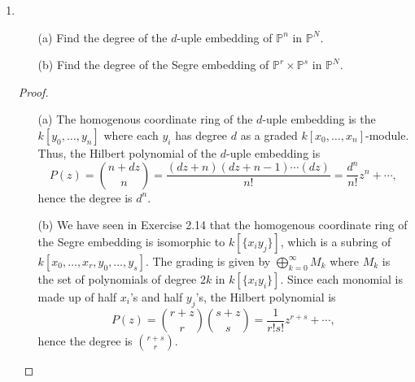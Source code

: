 \documentclass[12pt]{article}
\newcommand{\PP}{\mathbb{P}}
\theoremstyle{definition}
\begin{document}
\begin{enumerate} [label=\textbf{\arabic*.}, leftmargin=-0.05em]

\item \begin{itemize}
  \item[(a)] Find the degree of the $d$-uple embedding of $\PP^n$ in $\PP^N$.
  \item[(b)] Find the degree of the Segre embedding of $\PP^r \times \PP^s$ in $\PP^N$.
\end{itemize}

\begin{proof} $ $ \vspace{0pt}
  \begin{itemize}
    \item[(a)] The homogenous coordinate ring of the $d$-uple embedding is the $k[y_0, \dots, y_n]$ where each $y_i$ has degree $d$ as a graded $k[x_0, \dots, x_n]$-module. Thus, the Hilbert polynomial of the $d$-uple embedding is
    \begin{equation*}
      P(z) = {n + dz \choose n} = \frac{(dz + n)(dz + n - 1) \cdots (dz)}{n!} = \frac{d^n}{n!}z^n + \cdots,
    \end{equation*}
    hence the degree is $d^n$.

    \item[(b)] We have seen in Exercise 2.14 that the homogenous coordinate ring of the Segre embedding is isomorphic to $k[\{x_i y_j \}]$, which is a subring of $k[x_0, \dots, x_r, y_0, \dots, y_s]$. The grading is given by $\bigoplus_{k = 0}^\infty M_k$ where $M_k$ is the set of polynomials of degree $2k$ in $k[\{ x_i y_i \}]$. Since each monomial is made up of half $x_i$'s and half $y_j$'s, the Hilbert polynomial is
    \begin{equation*}
      P(z) = {r + z \choose r} {s + z \choose s} = \frac{1}{r!s!}z^{r + s} + \cdots,
    \end{equation*}
    hence the degree is ${r + s \choose r}$.
  \end{itemize}
\end{proof}


\end{enumerate}
\end{document}
